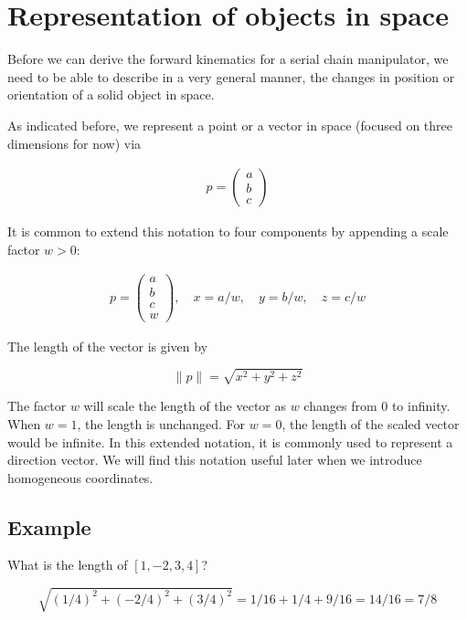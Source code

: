 \hypertarget{representation-of-objects-in-space}{%
\section{Representation of objects in
space}\label{representation-of-objects-in-space}}

Before we can derive the forward kinematics for a serial chain
manipulator, we need to be able to describe in a very general manner,
the changes in position or orientation of a solid object in space.

As indicated before, we represent a point or a vector in space (focused
on three dimensions for now) via

\[\begin{aligned}
p = \begin{pmatrix}
a \\
b \\
c \end{pmatrix}
\end{aligned}\]

It is common to extend this notation to four components by appending a
scale factor \(w>0\):

\[\begin{aligned}
p = \begin{pmatrix}
a \\
b \\
c \\
w \end{pmatrix}, \quad
x = a/w, \quad y = b/w, \quad z = c/w
\end{aligned}\]

The length of the vector is given by

\[\| p\| = \sqrt{x^2 + y^2 + z^2}\]

The factor \(w\) will scale the length of the vector as \(w\) changes
from 0 to infinity. When \(w=1\), the length is unchanged. For \(w=0\),
the length of the scaled vector would be infinite. In this extended
notation, it is commonly used to represent a direction vector. We will
find this notation useful later when we introduce homogeneous
coordinates.

\hypertarget{example}{%
\subsection{Example}\label{example}}

What is the length of \([1,-2,3,4]\)?

\[\sqrt{(1/4)^2 + (-2/4)^2 + (3/4)^2} = 1/16 + 1/4 + 9/16 = 14/16 = 7/8\]

